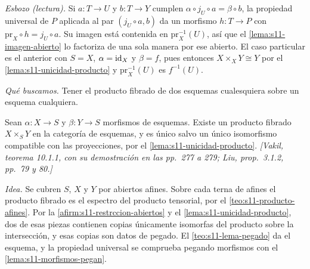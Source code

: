 \emph{Esbozo (lectura).} Si \(a\colon T\to U\) y \(b\colon T\to Y\) cumplen \(\alpha\circ j_U\circ a=\beta\circ b\), la propiedad universal de \(P\) aplicada al par \((j_U\circ a,b)\) da un morfismo \(h\colon T\to P\) con \(\mathrm{pr}_X\circ h=j_U\circ a\). Su imagen está contenida en \(\mathrm{pr}_X^{-1}(U)\), así que el \cref{lema:s11-imagen-abierto} lo factoriza de una sola manera por ese abierto. El caso particular es el anterior con \(S=X\), \(\alpha=\operatorname{id}_X\) y \(\beta=f\), pues entonces \(X\times_X Y\cong Y\) por el \cref{lema:s11-unicidad-producto} y \(\mathrm{pr}_X^{-1}(U)\) es \(f^{-1}(U)\).

\emph{Qué buscamos.} Tener el producto fibrado de dos esquemas cualesquiera sobre un esquema cualquiera.

\begin{teo}
\label{teo:s11-existencia}
Sean \(\alpha\colon X\to S\) y \(\beta\colon Y\to S\) morfismos de esquemas. Existe un producto fibrado \(X\times_S Y\) en la categoría de esquemas, y es único salvo un único isomorfismo compatible con las proyecciones, por el \cref{lema:s11-unicidad-producto}. \emph{[Vakil, teorema 10.1.1, con su demostración en las pp.~277 a 279; Liu, prop.~3.1.2, pp.~79 y 80.]}
\end{teo}

\emph{Idea.} Se cubren \(S\), \(X\) y \(Y\) por abiertos afines. Sobre cada terna de afines el producto fibrado es el espectro del producto tensorial, por el \cref{teo:s11-producto-afines}. Por la \cref{afirm:s11-restrccion-abiertos} y el \cref{lema:s11-unicidad-producto}, dos de esas piezas contienen copias únicamente isomorfas del producto sobre la intersección, y esas copias son datos de pegado. El \cref{teo:s11-lema-pegado} da el esquema, y la propiedad universal se comprueba pegando morfismos con el \cref{lema:s11-morfismos-pegan}.

